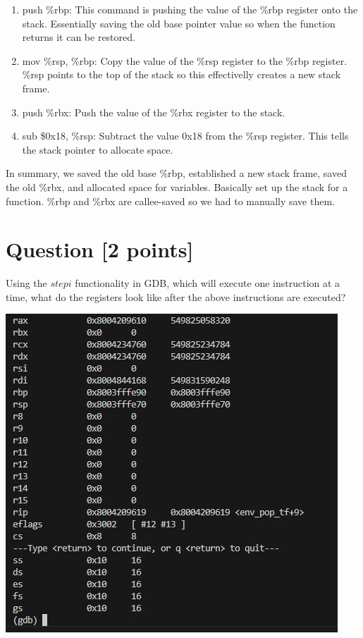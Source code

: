 \documentclass[11pt]{article}
\begin{document}
\begin{solution}
    \begin{enumerate}
        \item push \%rbp: This command is pushing the value of the \%rbp register onto the stack. 
        Essentially saving the old base pointer value so when the function returns it can be restored.

        \item mov \%rsp, \%rbp: Copy the value of the \%rsp register to the \%rbp register. \%rsp points to the top 
        of the stack so this effectivelly creates a new stack frame. 

        \item push \%rbx: Push the value of the \%rbx register to the stack. 

        \item sub \$0x18, \%rsp: Subtract the value 0x18 from the \%rsp register. This tells the stack pointer to 
        allocate space.
    \end{enumerate}

In summary, we saved the old base \%rbp, established a new stack frame, saved the old \%rbx, and allocated space 
for variables. Basically set up the stack for a function. \%rbp and \%rbx are callee-saved so we had to manually 
save them. 
\end{solution}


\section{Question [2 points]}

Using the $stepi$ functionality in GDB, which will execute one instruction at a time, 
what do the registers look like after the above instructions are executed?

\begin{solution}
\includegraphics{register_output.jpg}
\end{solution}
\end{document}
